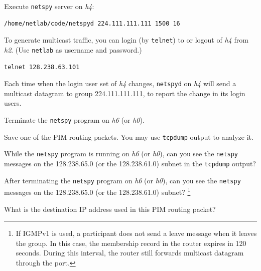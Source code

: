 \documentclass{../UTNetLab}
\begin{document}
    Execute \lstinline{netspy} server on \textit{h4}:
    \begin{lstlisting}
/home/netlab/code/netspyd 224.111.111.111 1500 16
    \end{lstlisting}
    
    To generate multicast traffic, you can login (by \lstinline{telnet}) to or logout of \textit{h4} from \textit{h2}. (Use \texttt{netlab} as username and password.)
    \begin{lstlisting}
telnet 128.238.63.101
    \end{lstlisting}

    Each time when the login user set of \textit{h4} changes, \lstinline{netspyd} on \textit{h4} will send a multicast datagram to group 224.111.111.111, to report the change in its login users.

    Terminate the \lstinline{netspy} program on \textit{h6} (or \textit{h0}).

    Save one of the PIM routing packets.
    You may use \lstinline{tcpdump} output to analyze it.
    
    \begin{report}
    \item While the \lstinline{netspy} program is running on \textit{h6} (or \textit{h0}),
    can you see the \lstinline{netspy} messages on the 128.238.65.0 (or the 128.238.61.0) subnet in the \lstinline{tcpdump} output?

    \item After terminating the \lstinline{netspy} program on \textit{h6} (or \textit{h0}),
    can you see the \lstinline{netspy} messages on the 128.238.65.0 (or the 128.238.61.0) subnet?%
    \footnote{If IGMPv1 is used, a participant does not send a leave message when it leaves the group.
    In this case, the membership record in the router expires in 120 seconds.
    During this interval, the router still forwards multicast datagram through the port.} 

    \item What is the destination IP address used in this PIM routing packet?
    \end{report}
\end{document}

